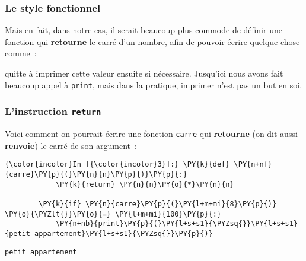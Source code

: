    \hypertarget{le-style-fonctionnel}{%
\subsubsection{Le style fonctionnel}\label{le-style-fonctionnel}}

    Mais en fait, dans notre cas, il serait beaucoup plus commode de définir
une fonction qui \textbf{retourne} le carré d'un nombre, afin de pouvoir
écrire quelque chose comme~:

    \begin{Shaded}
\begin{Highlighting}[frame=lines,framerule=0.6mm,rulecolor=\color{asisframecolor}]
\OperatorTok{=}\NormalTok{)}
\end{Highlighting}
\end{Shaded}

    quitte à imprimer cette valeur ensuite si nécessaire. Jusqu'ici nous
avons fait beaucoup appel à \texttt{print}, mais dans la pratique,
imprimer n'est pas un but en soi.

    \hypertarget{linstruction-return}{%
\subsubsection{\texorpdfstring{L'instruction
\texttt{return}}{L'instruction return}}\label{linstruction-return}}

    Voici comment on pourrait écrire une fonction \texttt{carre} qui
\textbf{retourne} (on dit aussi \textbf{renvoie}) le carré de son
argument~:

    \begin{Verbatim}[commandchars=\\\{\},frame=single,framerule=0.3mm,rulecolor=\color{cellframecolor}]
{\color{incolor}In [{\color{incolor}3}]:} \PY{k}{def} \PY{n+nf}{carre}\PY{p}{(}\PY{n}{n}\PY{p}{)}\PY{p}{:}
            \PY{k}{return} \PY{n}{n}\PY{o}{*}\PY{n}{n}
        
        \PY{k}{if} \PY{n}{carre}\PY{p}{(}\PY{l+m+mi}{8}\PY{p}{)} \PY{o}{\PYZlt{}}\PY{o}{=} \PY{l+m+mi}{100}\PY{p}{:}
            \PY{n+nb}{print}\PY{p}{(}\PY{l+s+s1}{\PYZsq{}}\PY{l+s+s1}{petit appartement}\PY{l+s+s1}{\PYZsq{}}\PY{p}{)}
\end{Verbatim}


    \begin{Verbatim}[commandchars=\\\{\},frame=single,framerule=0.3mm,rulecolor=\color{cellframecolor}]
petit appartement
\end{Verbatim}

